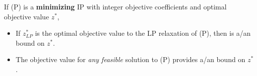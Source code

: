 \documentclass[11pt]{article}
\theoremstyle{definition}
\newcommand{\answerbox}[3]{%
  \fbox{%
    \begin{minipage}[#1]{#2}
      \hfill\vspace{#3}
    \end{minipage}
  }
}
\newcommand{\wordbox}{\answerbox{c}{1.2in}{.7cm}}
\newcommand{\catbox}{\answerbox{c}{.5in}{.7cm}}
\begin{document}
\begin{tcolorbox}
If (P) is a \textbf{minimizing} IP with integer objective coefficients and optimal objective value $z^*$,
\begin{itemize}
\item  If $z^*_{LP}$ is the optimal objective value to the LP relaxation of (P), then \catbox is a/an \wordbox bound on $z^*$.
\item  The objective value for \emph{any feasible} solution to (P) provides a/an \wordbox bound on $z^*$.
\end{itemize}
\end{tcolorbox}
\end{document}
